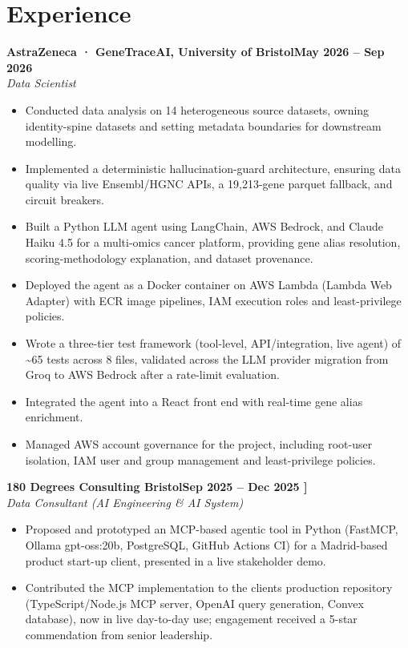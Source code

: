 \documentclass[a4paper,11pt]{article}
\newcommand{\entry}[4]{\needspace{4\baselineskip}\noindent\textbf{#1}\hfill\textbf{#2}\\ \textit{#3}\hfill\textit{#4}\par}
\begin{document}
\section{Experience}
\entry{AstraZeneca · GeneTraceAI, University of Bristol}{May 2026 – Sep 2026}{Data Scientist}{}
\begin{itemize}
  \item Conducted data analysis on 14 heterogeneous source datasets, owning identity-spine datasets and setting metadata boundaries for downstream modelling.
  \item Implemented a deterministic hallucination-guard architecture, ensuring data quality via live Ensembl/HGNC APIs, a 19,213-gene parquet fallback, and circuit breakers.
  \item Built a Python LLM agent using LangChain, AWS Bedrock, and Claude Haiku 4.5 for a multi-omics cancer platform, providing gene alias resolution, scoring-methodology explanation, and dataset provenance.
  \item Deployed the agent as a Docker container on AWS Lambda (Lambda Web Adapter) with ECR image pipelines, IAM execution roles and least-privilege policies.
  \item Wrote a three-tier test framework (tool-level, API/integration, live agent) of \textasciitilde{}65 tests across 8 files, validated across the LLM provider migration from Groq to AWS Bedrock after a rate-limit evaluation.
  \item Integrated the agent into a React front end with real-time gene alias enrichment.
  \item Managed AWS account governance for the project, including root-user isolation, IAM user and group management and least-privilege policies.
\end{itemize}
\vspace{4pt}
\entry{180 Degrees Consulting Bristol}{Sep 2025 – Dec 2025   ]}{Data Consultant (AI Engineering \& AI System)}{}
\begin{itemize}
  \item Proposed and prototyped an MCP-based agentic tool in Python (FastMCP, Ollama gpt-oss:20b, PostgreSQL, GitHub Actions CI) for a Madrid-based product start-up client, presented in a live stakeholder demo.
  \item Contributed the MCP implementation to the client\textquotesingle{}s production repository (TypeScript/Node.js MCP server, OpenAI query generation, Convex database), now in live day-to-day use; engagement received a 5-star commendation from senior leadership.
\end{itemize}
\end{document}
